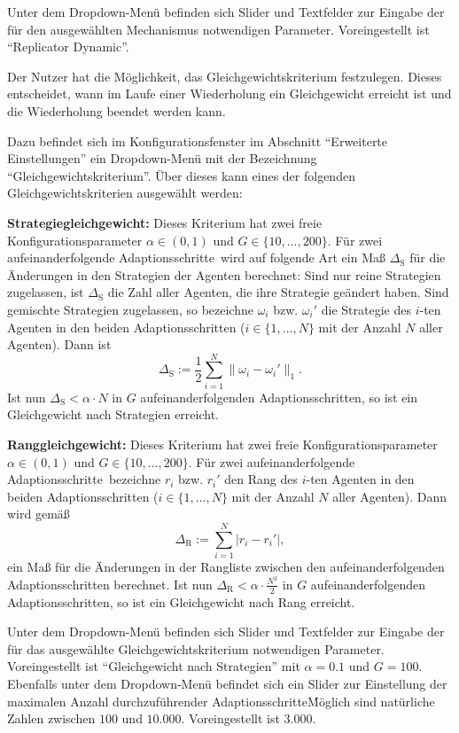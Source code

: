 \documentclass[parskip=full,11pt]{scrartcl}
\def\adapts{Adaptionsschritte}
\begin{document}
Unter dem Dropdown-Menü befinden sich Slider und Textfelder zur Eingabe der für den ausgewählten Mechanismus notwendigen Parameter. Voreingestellt ist \enquote{Replicator Dynamic}.

Der Nutzer hat die Möglichkeit, das Gleichgewichtskriterium festzulegen. Dieses entscheidet, wann im Laufe einer Wiederholung ein Gleichgewicht erreicht ist und die Wiederholung beendet werden kann.

Dazu befindet sich im Konfigurationsfenster im Abschnitt \enquote{Erweiterte Einstellungen} ein Dropdown-Menü mit der Bezeichnung \enquote{Gleichgewichtskriterium}. Über dieses kann eines der folgenden Gleichgewichtskriterien ausgewählt werden:

\textbf{Strategiegleichgewicht:}
Dieses Kriterium hat zwei freie Konfigurationsparameter \(\alpha \in (0,1)\) und \(G \in \{10,...,200\}\). Für zwei aufeinanderfolgende \adapts\ wird auf folgende Art ein Maß \(\Delta_\text{S}\) für die Änderungen in den Strategien der Agenten berechnet: Sind nur reine Strategien zugelassen, ist \(\Delta_\text{S}\)  die Zahl aller Agenten, die ihre Strategie geändert haben. Sind gemischte Strategien zugelassen, so bezeichne \(\omega_i\) bzw. \(\omega_i'\) die Strategie des \(i\)-ten Agenten in den beiden \adapts n (\(i \in \{1,...,N\}\) mit der Anzahl \(N\) aller Agenten). Dann ist
\[
\Delta_\text{S} :=\frac 12 \sum_{i=1}^N \|\omega_i - \omega_i'\|_1.
\]
Ist nun \(\Delta_\text{S} < \alpha \cdot N\) in \(G\) aufeinanderfolgenden \adapts n, so ist ein Gleichgewicht nach Strategien erreicht.

\textbf{Ranggleichgewicht:}
Dieses Kriterium hat zwei freie Konfigurationsparameter \(\alpha \in (0,1)\) und \(G \in \{10,...,200\}\). Für zwei aufeinanderfolgende \adapts\ bezeichne \(r_i\) bzw. \(r_i'\) den Rang des \(i\)-ten Agenten in den beiden \adapts n (\(i \in \{1,...,N\}\) mit der Anzahl \(N\) aller Agenten). Dann wird gemäß
\[
\Delta_\text{R} := \sum_{i=1}^N |r_i - r_i'|,
\]
ein Maß für die Änderungen in der Rangliste zwischen den aufeinanderfolgenden \adapts n berechnet. Ist nun \(\Delta_\text{R} < \alpha \cdot \frac{N^2}{2}\) in \(G\) aufeinanderfolgenden \adapts n, so ist ein Gleichgewicht nach Rang erreicht.

Unter dem Dropdown-Menü befinden sich Slider und Textfelder zur Eingabe der für das ausgewählte Gleichgewichtskriterium notwendigen Parameter. Voreingestellt ist \enquote{Gleichgewicht nach Strategien} mit \(\alpha = 0.1\) und \(G = 100\). Ebenfalls unter dem Dropdown-Menü befindet sich ein Slider zur Einstellung der maximalen Anzahl durchzuführender \adapts\. Möglich sind natürliche Zahlen zwischen \(100\) und \(10.000\). Voreingestellt ist \(3.000\).
\end{document}
